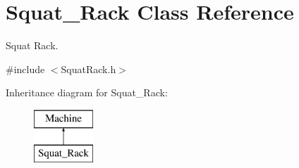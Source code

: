 \hypertarget{class_squat___rack}{}\section{Squat\+\_\+\+Rack Class Reference}
\label{class_squat___rack}


Squat Rack.  




{\ttfamily \#include $<$Squat\+Rack.\+h$>$}

Inheritance diagram for Squat\+\_\+\+Rack\+:\begin{figure}[H]
\begin{center}
\leavevmode
\includegraphics[height=2.000000cm]{class_squat___rack}
\end{center}
\end{figure}
